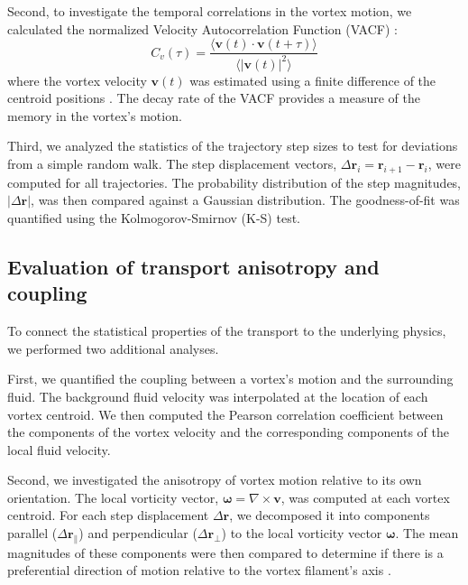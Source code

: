 \documentclass[]{article}
\begin{document}
Second, to investigate the temporal correlations in the vortex motion, we calculated the normalized Velocity Autocorrelation Function (VACF) \citep{bradley2025velocitycorrelationsvorticesrarefaction}:
\begin{equation}
C_v(\tau) = \frac{\langle \mathbf{v}(t) \cdot \mathbf{v}(t+\tau) \rangle}{\langle |\mathbf{v}(t)|^2 \rangle}
\end{equation}
where the vortex velocity $\mathbf{v}(t)$ was estimated using a finite difference of the centroid positions \citep{ashraf2025experimentalinvestigationwaterexit}. The decay rate of the VACF provides a measure of the memory in the vortex's motion.

Third, we analyzed the statistics of the trajectory step sizes to test for deviations from a simple random walk. The step displacement vectors, $\Delta \mathbf{r}_i = \mathbf{r}_{i+1} - \mathbf{r}_i$, were computed for all trajectories. The probability distribution of the step magnitudes, $|\Delta \mathbf{r}|$, was then compared against a Gaussian distribution. The goodness-of-fit was quantified using the Kolmogorov-Smirnov (K-S) test.

\subsection{Evaluation of transport anisotropy and coupling}

To connect the statistical properties of the transport to the underlying physics, we performed two additional analyses.

First, we quantified the coupling between a vortex's motion and the surrounding fluid. The background fluid velocity was interpolated at the location of each vortex centroid. We then computed the Pearson correlation coefficient between the components of the vortex velocity and the corresponding components of the local fluid velocity.

Second, we investigated the anisotropy of vortex motion relative to its own orientation. The local vorticity vector, $\boldsymbol{\omega} = \nabla \times \mathbf{v}$, was computed at each vortex centroid. For each step displacement $\Delta\mathbf{r}$, we decomposed it into components parallel ($\Delta\mathbf{r}_\parallel$) and perpendicular ($\Delta\mathbf{r}_\perp$) to the local vorticity vector $\boldsymbol{\omega}$. The mean magnitudes of these components were then compared to determine if there is a preferential direction of motion relative to the vortex filament's axis \citep{zhang2019imaginganisotropicvortexdynamics}.
\end{document}
